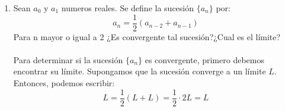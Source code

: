 \documentclass[a4paper]{article}
\begin{document}
\begin{enumerate}
    \item Sean $a_0$ y $a_1$ numeros reales. Se define la sucesión $\{a_n\}$ por:
    \begin{equation*}
        a_n = \frac{1}{2}\left(a_{n-2}+a_{n-1}\right)
    \end{equation*}
    Para n mayor o igual a 2 ¿Es convergente tal sucesión?¿Cual es el límite?\\\\
    Para determinar si la sucesión $\{a_n\}$ es convergente, primero debemos encontrar su límite. Supongamos que la sucesión converge a un límite $L$. Entonces, podemos escribir:
\begin{equation*}
    L = \frac{1}{2}\left(L + L\right) = \frac{1}{2} \cdot 2L = L
\end{equation*}

\end{enumerate}
\end{document}

